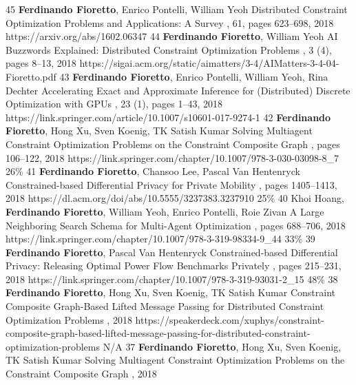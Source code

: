 \begin{pubs}

\journalentry
	{45}	%
	{{\bf Ferdinando Fioretto}, Enrico Pontelli, William Yeoh}
	{Distributed Constraint Optimization Problems and Applications: A Survey}
	{\JAIR, 61, pages 623--698, 2018} 
	{https://arxiv.org/abs/1602.06347}
\journalentry 
	{44}	%
	{{\bf Ferdinando Fioretto}, William Yeoh}
	{AI Buzzwords Explained: Distributed Constraint Optimization Problems}
	{, 3 (4), pages 8--13, 2018}
	{https://sigai.acm.org/static/aimatters/3-4/AIMatters-3-4-04-Fioretto.pdf}
\journalentry 
	{43}	%
	{{\bf Ferdinando Fioretto}, Enrico Pontelli, William Yeoh, Rina Dechter}
	{Accelerating Exact and Approximate Inference for (Distributed) Discrete Optimization with GPUs}
	{, 23 (1), pages 1--43, 2018}
	{https://link.springer.com/article/10.1007/s10601-017-9274-1}
\confentry 
	{42} %
	{{\bf Ferdinando Fioretto}, Hong Xu, Sven Koenig, TK Satish Kumar}
 	{Solving Multiagent Constraint Optimization Problems on the Constraint Composite Graph}
	{\procPRIMA, pages 106--122, 2018}
	{https://link.springer.com/chapter/10.1007/978-3-030-03098-8\_7}
    {26\%} %
\confentry
	{41} %
  	{{\bf Ferdinando Fioretto}, Chansoo Lee, Pascal Van Hentenryck}
  	{Constrained-based Differential Privacy for Private Mobility} 
  	{\procAAMAS, pages 1405--1413, 2018}
  	{https://dl.acm.org/doi/abs/10.5555/3237383.3237910}
    {25\%} %
\confentry 
	{40} %
	{Khoi Hoang, {\bf Ferdinando Fioretto}, William Yeoh, Enrico Pontelli, Roie Zivan}
	{A Large Neighboring Search Schema for Multi-Agent Optimization}
	{\procCP, pages 688--706, 2018}
	{https://link.springer.com/chapter/10.1007/978-3-319-98334-9\_44}
    {33\%} %
\confentry 
	{39} %
	{{\bf Ferdinando Fioretto}, Pascal Van Hentenryck}
	{Constrained-based Differential Privacy: Releasing Optimal Power Flow Benchmarks Privately} 
	{\procCPAIOR, pages 215--231, 2018}
	{https://link.springer.com/chapter/10.1007/978-3-319-93031-2\_15}
    {48\%}
\confentry
	{38} %
	{{\bf Ferdinando Fioretto}, Hong Xu, Sven Koenig, TK Satish Kumar}
	{Constraint Composite Graph-Based Lifted Message Passing for Distributed Constraint Optimization Problems}
	{\procISIAM, 2018}
	{https://speakerdeck.com/xuphys/constraint-composite-graph-based-lifted-message-passing-for-distributed-constraint-optimization-problems}
	{N/A}
\wsentry
	{37} %
	{{\bf Ferdinando Fioretto}, Hong Xu, Sven Koenig, TK Satish Kumar}
	{Solving Multiagent Constraint Optimization Problems on the Constraint Composite Graph} 
	{, 2018}
	{~}


\end{pubs}

